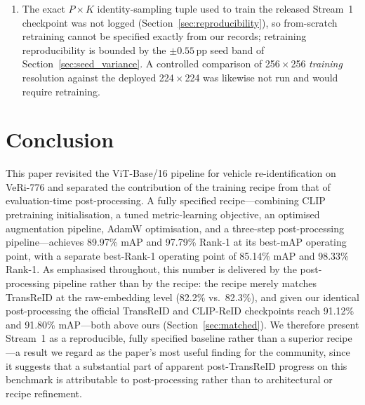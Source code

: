 \documentclass[10pt,a4paper]{article}
\begin{document}
\begin{enumerate}
    We did not evaluate under such a seen/unseen-type protocol; our in-domain
    numbers should be read as standard-protocol results, and the zero-shot
    VeRi-Wild transfer of Section~\ref{sec:veriwild} is our only probe of
    generalisation beyond the training distribution.
  \item The exact $P \times K$ identity-sampling tuple used to train the
    released Stream~1 checkpoint was not logged
    (Section~\ref{sec:reproducibility}), so from-scratch retraining cannot be
    specified exactly from our records; retraining reproducibility is bounded
    by the $\pm0.55$\,pp seed band of Section~\ref{sec:seed_variance}. A
    controlled comparison of 256\,$\times$\,256 \emph{training} resolution
    against the deployed 224\,$\times$\,224 was likewise not run and would
    require retraining.
\end{enumerate}

\section{Conclusion}
\label{sec:conclusion}

This paper revisited the ViT-Base/16 pipeline for vehicle re-identification on
VeRi-776 and separated the contribution of the training recipe from that of
evaluation-time post-processing. A fully specified recipe---combining CLIP
pretraining initialisation, a tuned metric-learning objective, an optimised
augmentation pipeline, AdamW optimisation, and a three-step post-processing
pipeline---achieves 89.97\% mAP and 97.79\% Rank-1 at its best-mAP operating
point, with a separate best-Rank-1 operating point of 85.14\% mAP and 98.33\%
Rank-1. As emphasised throughout, this number is delivered by the
post-processing pipeline rather than by the recipe: the recipe merely matches
TransReID at the raw-embedding level (82.2\% vs.\ 82.3\%), and given our
identical post-processing the official TransReID and CLIP-ReID checkpoints
reach 91.12\% and 91.80\% mAP---both above ours
(Section~\ref{sec:matched}). We therefore present Stream~1 as a reproducible,
fully specified baseline rather than a superior recipe---a result we regard as
the paper's most useful finding for the community, since it suggests that a
substantial part of apparent post-TransReID progress on this benchmark is
attributable to post-processing rather than to architectural or recipe
refinement.
\end{document}
